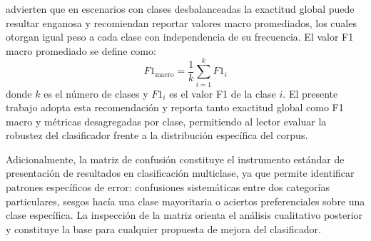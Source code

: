 \textcite{Sokolova2009_performance_measures} advierten que en escenarios con clases desbalanceadas la exactitud global puede resultar enganosa y recomiendan reportar valores macro promediados, los cuales otorgan igual peso a cada clase con independencia de su frecuencia. El valor F1 macro promediado se define como:
\[
F1_{\text{macro}} = \frac{1}{k} \sum_{i=1}^{k} F1_{i}
\]
donde \(k\) es el número de clases y \(F1_{i}\) es el valor F1 de la clase \(i\). El presente trabajo adopta esta recomendación y reporta tanto exactitud global como F1 macro y métricas desagregadas por clase, permitiendo al lector evaluar la robustez del clasificador frente a la distribución específica del corpus.

Adicionalmente, la matriz de confusión constituye el instrumento estándar de presentación de resultados en clasificación multiclase, ya que permite identificar patrones específicos de error: confusiones sistemáticas entre dos categorías particulares, sesgos hacía una clase mayoritaria o aciertos preferenciales sobre una clase específica. La inspección de la matriz orienta el análisis cualitativo posterior y constituye la base para cualquier propuesta de mejora del clasificador.

\newpage
